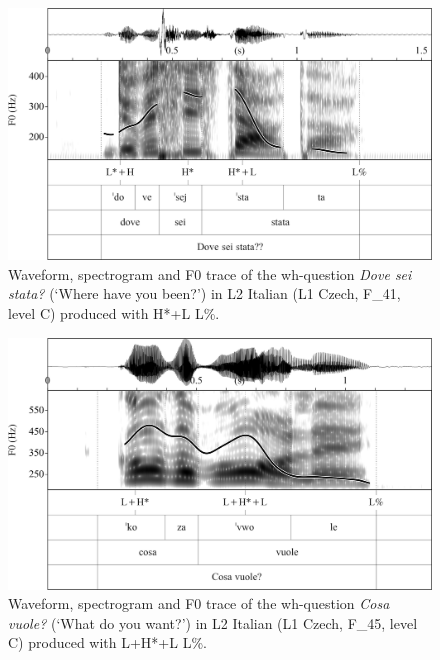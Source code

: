 \begin{figure}


\includegraphics[width=\textwidth]{figures/Figure_4.128.png}



\caption{Waveform, spectrogram and F0 trace of the wh-question \textit{Dove sei stata?} (‘Where have you been?’) in L2 Italian (L1 Czech, F\_41, level C) produced with H*+L L\%.}
\label{fig:4.128}
\end{figure}

\begin{figure}


\includegraphics[width=\textwidth]{figures/Figure_4.129.png}



\caption{Waveform, spectrogram and F0 trace of the wh-question \textit{Cosa vuole?} (‘What do you want?’) in L2 Italian (L1 Czech, F\_45, level C) produced with L+H*+L L\%.}
\label{fig:4.129}
\end{figure}

